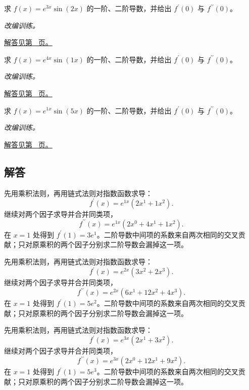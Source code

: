 \documentclass[12pt,fontset=fandol]{ctexart}
\begin{document}
\begin{example}[指数与三角函数的复合求导]\label{ex:c8q22}
求 $f(x)=e^{3x}\sin(2x)$ 的一阶、二阶导数，并给出 $f^{\prime}(0)$ 与 $f^{\prime\prime}(0)$。
\par\textit{改编训练。}\par\hyperref[ans:c8q22]{解答见第~\pageref{ans:c8q22} 页。}
\end{example}
\begin{example}[指数与三角函数的复合求导]\label{ex:c8q23}
求 $f(x)=e^{4x}\sin(1x)$ 的一阶、二阶导数，并给出 $f^{\prime}(0)$ 与 $f^{\prime\prime}(0)$。
\par\textit{改编训练。}\par\hyperref[ans:c8q23]{解答见第~\pageref{ans:c8q23} 页。}
\end{example}
\begin{example}[指数与三角函数的复合求导]\label{ex:c8q24}
求 $f(x)=e^{1x}\sin(5x)$ 的一阶、二阶导数，并给出 $f^{\prime}(0)$ 与 $f^{\prime\prime}(0)$。
\par\textit{改编训练。}\par\hyperref[ans:c8q24]{解答见第~\pageref{ans:c8q24} 页。}
\end{example}
\subsection{解答}
\begin{solve}\label{ans:c8q1}
先用乘积法则，再用链式法则对指数函数求导：
\[
f^{\prime}(x)=e^{1x}(2x^{1}+1x^{2}).
\]
继续对两个因子求导并合并同类项，
\[
f^{\prime\prime}(x)=e^{1x}\left(2x^{0}+4x^{1}+1x^{2}\right).
\]
在 $x=1$ 处得到 $f^{\prime}(1)=3e^{1}$。二阶导数中间项的系数来自两次相同的交叉贡献；只对原乘积的两个因子分别求二阶导数会漏掉这一项。
\end{solve}

\begin{solve}\label{ans:c8q2}
先用乘积法则，再用链式法则对指数函数求导：
\[
f^{\prime}(x)=e^{2x}(3x^{2}+2x^{3}).
\]
继续对两个因子求导并合并同类项，
\[
f^{\prime\prime}(x)=e^{2x}\left(6x^{1}+12x^{2}+4x^{3}\right).
\]
在 $x=1$ 处得到 $f^{\prime}(1)=5e^{2}$。二阶导数中间项的系数来自两次相同的交叉贡献；只对原乘积的两个因子分别求二阶导数会漏掉这一项。
\end{solve}

\begin{solve}\label{ans:c8q3}
先用乘积法则，再用链式法则对指数函数求导：
\[
f^{\prime}(x)=e^{3x}(2x^{1}+3x^{2}).
\]
继续对两个因子求导并合并同类项，
\[
f^{\prime\prime}(x)=e^{3x}\left(2x^{0}+12x^{1}+9x^{2}\right).
\]
在 $x=1$ 处得到 $f^{\prime}(1)=5e^{3}$。二阶导数中间项的系数来自两次相同的交叉贡献；只对原乘积的两个因子分别求二阶导数会漏掉这一项。
\end{solve}
\end{document}
